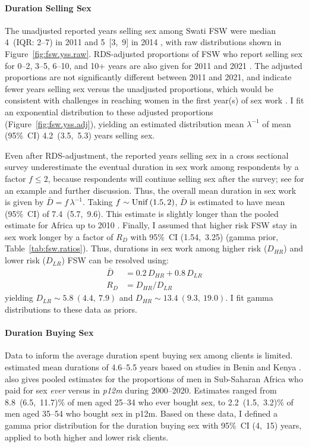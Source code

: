 \paragraph{Duration Selling Sex}
The unadjusted reported years selling sex among Swati FSW were
median 4~(IQR: 2--7) in 2011 \cite{Baral2014} and 5~[3,~9] in 2014 \cite{EswKP2014},
with raw distributions shown in Figure~\ref{fig:fsw.yss.raw}.
RDS-adjusted proportions of FSW who report selling sex for 0--2, 3--5, 6--10, and 10+ years
are also given for 2011 \cite{Baral2014} and 2021 \cite{EswIBBS2022}.
The adjusted proportions are not significantly different between 2011 and 2021,
and indicate fewer years selling sex versus the unadjusted proportions,
which would be consistent with
challenges in reaching women in the first year(s) of sex work \cite{Cheuk2020}.
I fit an exponential distribution to these adjusted proportions (Figure~\ref{fig:fsw.yss.adj}),
yielding an estimated distribution mean ${\lambda}^{-1}$
of mean (95\%~CI) 4.2~(3.5,~5.3) years selling sex.
\par
Even after RDS-adjustment,
the reported years selling sex in a cross sectional survey
underestimate the eventual duration in sex work among respondents
by a factor $f \le 2$,
because respondents will continue selling sex after the survey;
see  for an example and further discussion.
Thus, the overall mean duration in sex work is given by $\bar{D} = f\,\lambda^{-1}$.
Taking $f \sim \operatorname{Unif}\,(1.5,2)$,
$\bar{D}$ is estimated to have mean (95\%~CI) of 7.4~(5.7,~9.6).
This estimate is slightly longer than the pooled estimate for Africa up to 2010 \cite{Fazito2012}.
Finally, I assumed that higher risk FSW stay in sex work longer by a factor of
$R_{D}$ with 95\%~CI (1.54,~3.25) (gamma prior, Table~\ref{tab:fsw.ratios}).
Thus, durations in sex work among higher risk ($D_{HR}$) and lower risk ($D_{LR}$) FSW
can be resolved using:
\begin{equation}
  \begin{aligned}
    \bar{D} &= 0.2\,D_{HR} + 0.8\,D_{LR} \\
    R_{D} &= D_{HR} / D_{LR}
  \end{aligned}
\end{equation}
yielding $D_{LR} \sim 5.8~(4.4,~7.9)$ and $D_{HR} \sim 13.4~(9.3,~19.0)$.
I fit gamma distributions to these data as priors.
\paragraph{Duration Buying Sex}
Data to inform the average duration spent buying sex among clients is limited.
\citet{Fazito2012} estimated mean durations of 4.6--5.5 years
based on studies in Benin \cite{Lowndes2000} and Kenya \cite{Voeten2002}.
\citet[Table~G]{Hodgins2022} also gives pooled estimates for
the proportions of men in Sub-Saharan Africa
who paid for sex \emph{ever} versus in \emph{p12m} during 2000--2020.
Estimates ranged from 8.8~(6.5,~11.7)\% of men aged 25--34 who ever bought sex,
to 2.2~(1.5,~3.2)\% of men aged 35--54 who bought sex in p12m.
Based on these data, I defined a gamma prior distribution for the duration buying sex
with 95\%~CI (4,~15) years, applied to both higher and lower risk clients.
